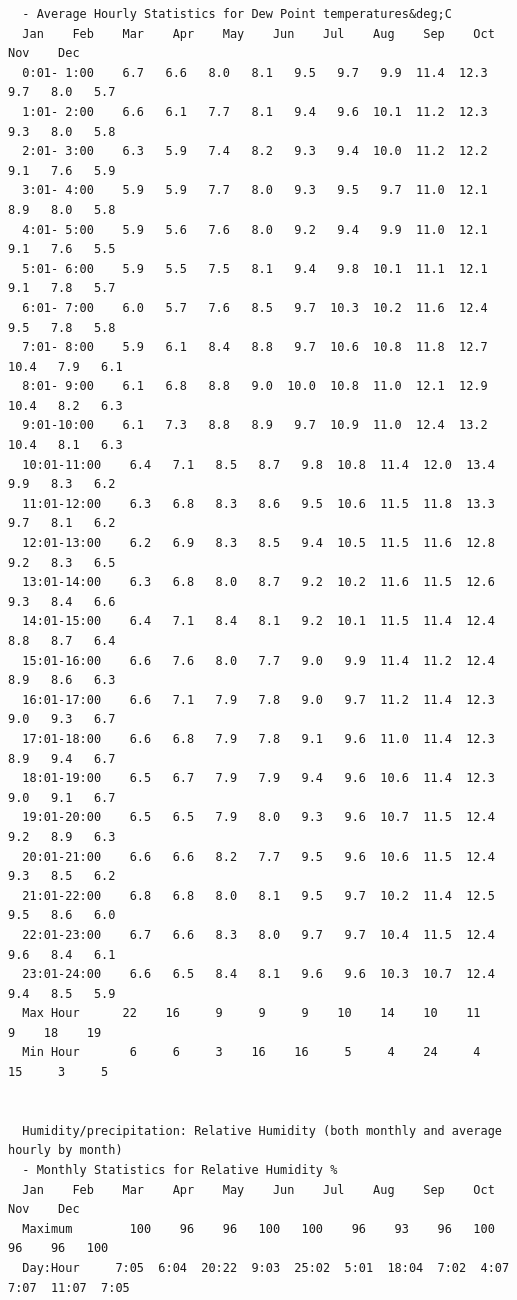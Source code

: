 \begin{lstlisting}
  - Average Hourly Statistics for Dew Point temperatures&deg;C
  Jan    Feb    Mar    Apr    May    Jun    Jul    Aug    Sep    Oct    Nov    Dec   
  0:01- 1:00    6.7   6.6   8.0   8.1   9.5   9.7   9.9  11.4  12.3   9.7   8.0   5.7 
  1:01- 2:00    6.6   6.1   7.7   8.1   9.4   9.6  10.1  11.2  12.3   9.3   8.0   5.8 
  2:01- 3:00    6.3   5.9   7.4   8.2   9.3   9.4  10.0  11.2  12.2   9.1   7.6   5.9 
  3:01- 4:00    5.9   5.9   7.7   8.0   9.3   9.5   9.7  11.0  12.1   8.9   8.0   5.8 
  4:01- 5:00    5.9   5.6   7.6   8.0   9.2   9.4   9.9  11.0  12.1   9.1   7.6   5.5 
  5:01- 6:00    5.9   5.5   7.5   8.1   9.4   9.8  10.1  11.1  12.1   9.1   7.8   5.7 
  6:01- 7:00    6.0   5.7   7.6   8.5   9.7  10.3  10.2  11.6  12.4   9.5   7.8   5.8 
  7:01- 8:00    5.9   6.1   8.4   8.8   9.7  10.6  10.8  11.8  12.7  10.4   7.9   6.1 
  8:01- 9:00    6.1   6.8   8.8   9.0  10.0  10.8  11.0  12.1  12.9  10.4   8.2   6.3 
  9:01-10:00    6.1   7.3   8.8   8.9   9.7  10.9  11.0  12.4  13.2  10.4   8.1   6.3 
  10:01-11:00    6.4   7.1   8.5   8.7   9.8  10.8  11.4  12.0  13.4   9.9   8.3   6.2 
  11:01-12:00    6.3   6.8   8.3   8.6   9.5  10.6  11.5  11.8  13.3   9.7   8.1   6.2 
  12:01-13:00    6.2   6.9   8.3   8.5   9.4  10.5  11.5  11.6  12.8   9.2   8.3   6.5 
  13:01-14:00    6.3   6.8   8.0   8.7   9.2  10.2  11.6  11.5  12.6   9.3   8.4   6.6 
  14:01-15:00    6.4   7.1   8.4   8.1   9.2  10.1  11.5  11.4  12.4   8.8   8.7   6.4 
  15:01-16:00    6.6   7.6   8.0   7.7   9.0   9.9  11.4  11.2  12.4   8.9   8.6   6.3 
  16:01-17:00    6.6   7.1   7.9   7.8   9.0   9.7  11.2  11.4  12.3   9.0   9.3   6.7 
  17:01-18:00    6.6   6.8   7.9   7.8   9.1   9.6  11.0  11.4  12.3   8.9   9.4   6.7 
  18:01-19:00    6.5   6.7   7.9   7.9   9.4   9.6  10.6  11.4  12.3   9.0   9.1   6.7 
  19:01-20:00    6.5   6.5   7.9   8.0   9.3   9.6  10.7  11.5  12.4   9.2   8.9   6.3 
  20:01-21:00    6.6   6.6   8.2   7.7   9.5   9.6  10.6  11.5  12.4   9.3   8.5   6.2 
  21:01-22:00    6.8   6.8   8.0   8.1   9.5   9.7  10.2  11.4  12.5   9.5   8.6   6.0 
  22:01-23:00    6.7   6.6   8.3   8.0   9.7   9.7  10.4  11.5  12.4   9.6   8.4   6.1 
  23:01-24:00    6.6   6.5   8.4   8.1   9.6   9.6  10.3  10.7  12.4   9.4   8.5   5.9 
  Max Hour      22    16     9     9     9    10    14    10    11     9    18    19  
  Min Hour       6     6     3    16    16     5     4    24     4    15     3     5  


  Humidity/precipitation: Relative Humidity (both monthly and average hourly by month)
  - Monthly Statistics for Relative Humidity %
  Jan    Feb    Mar    Apr    May    Jun    Jul    Aug    Sep    Oct    Nov    Dec
  Maximum        100    96    96   100   100    96    93    96   100    96    96   100
  Day:Hour     7:05  6:04  20:22  9:03  25:02  5:01  18:04  7:02  4:07  7:07  11:07  7:05



\end{lstlisting}
